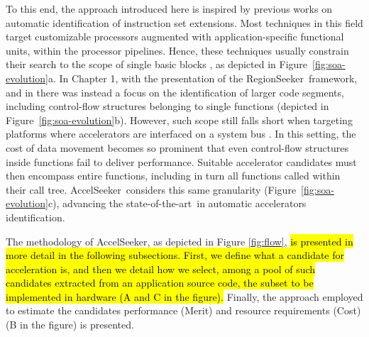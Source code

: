 \documentclass[]{usiinfthesis}
\newcommand{\aseeker}{{AccelSeeker}}
\newcommand{\rseeker}{{RegionSeeker}}
\newcommand{\SoTA}{{state-of-the-art}}
\begin{document}
To this end, the approach introduced here is inspired by previous works 
on automatic
identification of instruction set extensions. Most techniques in this
field target customizable processors augmented with
application-specific functional units, within the processor pipelines.
Hence, these techniques usually constrain their search to the scope of
single basic blocks \cite{PozziJul06} \cite{GiaquintaMar15}, as
depicted in Figure~\ref{fig:soa-evolution}a. In Chapter 1, with the 
presentation of the \rseeker\ framework, and in \cite{OppermannJul16} 
there was instead a focus on the identification of larger code segments, including
control-flow structures belonging to single functions (depicted in
Figure~\ref{fig:soa-evolution}b).  However, such scope still falls
short when targeting platforms where
accelerators are interfaced on a system bus
\cite{CotaJun15}. In this setting, the cost of data movement becomes
so prominent that even control-flow structures inside functions fail
to deliver performance. Suitable accelerator candidates must then
encompass entire functions, including in turn all functions called
within their call tree. \aseeker\ considers this same granularity
(Figure~\ref{fig:soa-evolution}c), advancing the \SoTA\ in
automatic accelerators identification.


The methodology of \aseeker, as depicted in Figure \ref{fig:flow}, 
\hl{
is presented in 
more detail in the following subsections. 
First, we define what a candidate for acceleration is, and then we detail how we select, 
among a pool of such candidates extracted from an application source code, the subset to 
be implemented in hardware (A and C in the figure).
}
Finally, the approach employed to estimate 
the candidates performance (Merit) and resource requirements (Cost) (B in the figure) is presented.
\end{document}
